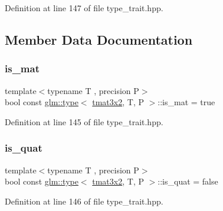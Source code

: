 Definition at line 147 of file type\+\_\+trait.\+hpp.



\subsection{Member Data Documentation}
\mbox{\label{structglm_1_1type_3_01tmat3x2_00_01_t_00_01_p_01_4_afe7ea7f17ffcf508e5100ab954d98c92}} 
\subsubsection{\texorpdfstring{is\_mat}{is\_mat}}
{\footnotesize\ttfamily template$<$typename T , precision P$>$ \\
bool const \mbox{\hyperlink{structglm_1_1type}{glm\+::type}}$<$ \mbox{\hyperlink{structglm_1_1tmat3x2}{tmat3x2}}, T, P $>$\+::is\+\_\+mat = true\hspace{0.3cm}{\ttfamily [static]}}



Definition at line 145 of file type\+\_\+trait.\+hpp.

\mbox{\label{structglm_1_1type_3_01tmat3x2_00_01_t_00_01_p_01_4_abbfc4e2ff155ef38687a479441705e6f}} 
\subsubsection{\texorpdfstring{is\_quat}{is\_quat}}
{\footnotesize\ttfamily template$<$typename T , precision P$>$ \\
bool const \mbox{\hyperlink{structglm_1_1type}{glm\+::type}}$<$ \mbox{\hyperlink{structglm_1_1tmat3x2}{tmat3x2}}, T, P $>$\+::is\+\_\+quat = false\hspace{0.3cm}{\ttfamily [static]}}



Definition at line 146 of file type\+\_\+trait.\+hpp.

\mbox{\label{structglm_1_1type_3_01tmat3x2_00_01_t_00_01_p_01_4_a80207f1c8bb7ba278e7d2f18e2b2f8ce}} 
